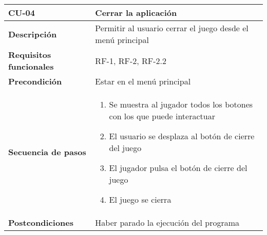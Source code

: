 \begin{longtable}{l|l}
\begin{minipage}{0.25\columnwidth}
\textbf{CU-04} 
\end{minipage}
&
\begin{minipage}{0.65\columnwidth}
Cerrar la aplicación
\end{minipage}
\\ \hline

\begin{minipage}{0.25\columnwidth}
\textbf{Descripción} 
\end{minipage}
&
\begin{minipage}{0.65\columnwidth}
Permitir al usuario cerrar el juego desde el menú principal
\end{minipage}
\\ \hline

\begin{minipage}{0.25\columnwidth}
\textbf{Requisitos funcionales} 
\end{minipage}
&
\begin{minipage}{0.65\columnwidth}
RF-1, RF-2, RF-2.2
\end{minipage}
\\ \hline

\begin{minipage}{0.25\columnwidth}
\textbf{Precondición} 
\end{minipage}
&
\begin{minipage}{0.65\columnwidth}
Estar en el menú principal
\end{minipage}
\\ \hline

\begin{minipage}{0.25\columnwidth}
\textbf{Secuencia de pasos} 
\end{minipage}
&
\begin{minipage}{0.65\columnwidth}
\begin{enumerate}
\item
Se muestra al jugador todos los botones con los que puede interactuar
\item
El usuario se desplaza al botón de cierre del juego
\item
El jugador pulsa el botón de cierre del juego
\item
El juego se cierra
\end{enumerate}
\end{minipage}
\\ \hline

\begin{minipage}{0.25\columnwidth}
\textbf{Postcondiciones} 
\end{minipage}
&
\begin{minipage}{0.65\columnwidth}
Haber parado la ejecución del programa
\end{minipage}
\\ \hline


\end{longtable}
